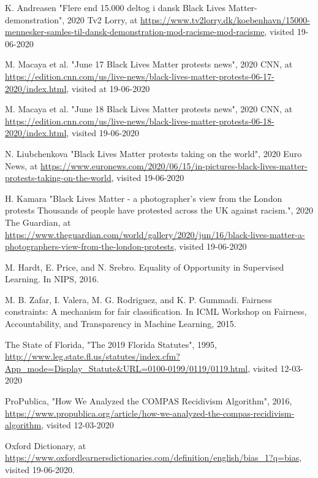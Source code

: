 \documentclass[11pt, fleqn, titlepage]{article}
\begin{document}
	\newpage
	\begin{thebibliography}{9} \label{bibliography}
		
		 K. Andreasen "Flere end 15.000 deltog i dansk Black Lives Matter-demonstration", 2020 Tv2 Lorry, at \url{https://www.tv2lorry.dk/koebenhavn/15000-mennesker-samles-til-dansk-demonstration-mod-racisme-mod-racisme}, visited 19-06-2020
		
		  M. Macaya et al. "June 17 Black Lives Matter protests news", 2020 CNN, at \url{https://edition.cnn.com/us/live-news/black-lives-matter-protests-06-17-2020/index.html}, visited at 19-06-2020
		
		 M. Macaya et al. "June 18 Black Lives Matter protests news", 2020 CNN, at \url{https://edition.cnn.com/us/live-news/black-lives-matter-protests-06-18-2020/index.html}, visited 19-06-2020
		
		 N. Liubchenkova "Black Lives Matter protests taking on the world", 2020 Euro News, at \url{https://www.euronews.com/2020/06/15/in-pictures-black-lives-matter-protests-taking-on-the-world}, visited 19-06-2020
		
		 H. Kamara "Black Lives Matter - a photographer's view from the London protests
		Thousands of people have protested across the UK against racism.", 2020 The Guardian, at \url{https://www.theguardian.com/world/gallery/2020/jun/16/black-lives-matter-a-photographers-view-from-the-london-protests}, visited 19-06-2020
		
		 M. Hardt, E. Price, and N. Srebro. Equality of Opportunity in Supervised Learning. In NIPS, 2016.
		
		 M. B. Zafar, I. Valera, M. G. Rodriguez, and K. P. Gummadi. Fairness constraints: A mechanism for fair classification.
		In ICML Workshop on Fairness, Accountability, and Transparency in Machine Learning, 2015.
		
		 The State of Florida, "The 2019 Florida Statutes", 1995,  \url{http://www.leg.state.fl.us/statutes/index.cfm?App_mode=Display_Statute&URL=0100-0199/0119/0119.html}, visited 12-03-2020
		
		 ProPublica, "How We Analyzed the COMPAS Recidivism Algorithm", 2016, \url{https://www.propublica.org/article/how-we-analyzed-the-compas-recidivism-algorithm}, visited 12-03-2020
		
		 Oxford Dictionary, at \url{https://www.oxfordlearnersdictionaries.com/definition/english/bias_1?q=bias}, visited 19-06-2020.
		

\end{thebibliography}
\end{document}
